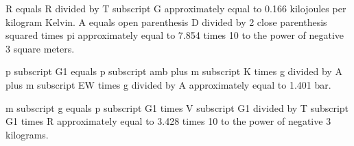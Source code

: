R equals R divided by T subscript G approximately equal to 0.166 kilojoules per kilogram Kelvin.  
A equals open parenthesis D divided by 2 close parenthesis squared times pi approximately equal to 7.854 times 10 to the power of negative 3 square meters.  

p subscript G1 equals p subscript amb plus m subscript K times g divided by A plus m subscript EW times g divided by A approximately equal to 1.401 bar.  

m subscript g equals p subscript G1 times V subscript G1 divided by T subscript G1 times R approximately equal to 3.428 times 10 to the power of negative 3 kilograms.